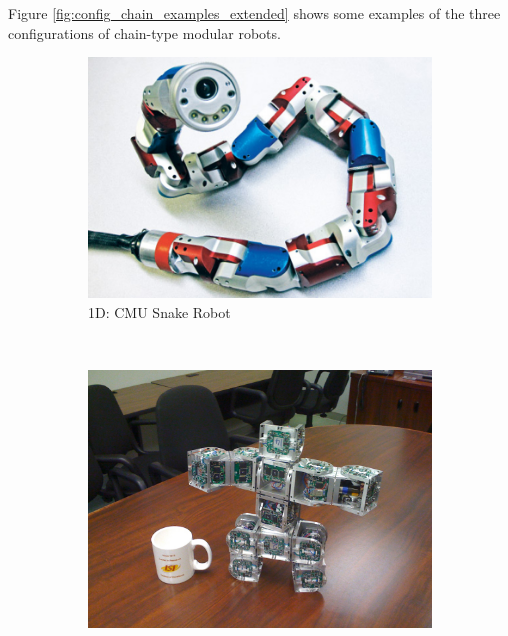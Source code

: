 Figure \ref{fig:config_chain_examples_extended} shows some examples of the three configurations of chain-type modular robots.\\

\begin{figure}[h]
		\centering
        \begin{subfigure}[b]{0.3\textwidth}
                \centering
                \includegraphics[width=\textwidth]{images/Conf_1D_CMU_snake_robot.jpg}
                \caption{1D: CMU Snake Robot}
                \label{fig:config_1D}
        \end{subfigure}
        ~
        \begin{subfigure}[b]{0.3\textwidth}
                \centering
                \includegraphics[width=\textwidth]{images/Conf_2D_superbot.jpg}

\end{subfigure}
\end{figure}
